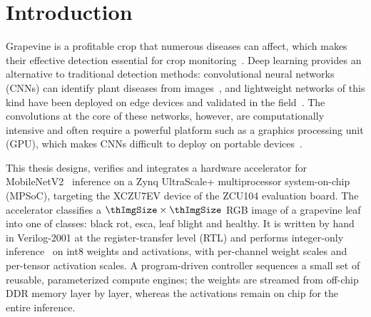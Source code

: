 %
\chapter{Introduction}
\label{chap:introduction}

Grapevine is a profitable crop that numerous diseases can affect, which makes
their effective detection essential for crop
monitoring~\cite{morellos2024iot}. Deep learning provides an alternative to
traditional detection methods: convolutional neural networks (CNNs) can
identify plant diseases from
images~\cite{mohanty2016plantdisease,liu2020grape}, and lightweight networks
of this kind have been deployed on edge devices and validated in the
field~\cite{morellos2024iot}. The convolutions at the core of these networks,
however, are computationally intensive and often require a powerful platform
such as a graphics processing unit (GPU), which makes CNNs difficult to deploy
on portable devices~\cite{bai2018dwsep}.

This thesis designs, verifies and integrates a hardware accelerator for
MobileNetV2~\cite{sandler2018mobilenetv2} inference on a Zynq UltraScale+
multiprocessor system-on-chip (MPSoC), targeting the XCZU7EV device of the
ZCU104 evaluation board. The accelerator classifies a
$\thImgSize \times \thImgSize$ RGB image of a grapevine leaf into one of
\thClasses{} classes: black rot, esca, leaf blight and healthy. It is written
by hand in Verilog-2001 at the register-transfer level (RTL) and performs
integer-only inference~\cite{jacob2018quantization} on int8 weights and
activations, with per-channel weight scales and per-tensor activation scales.
A program-driven controller sequences a small set of reusable, parameterized
compute engines; the weights are streamed from off-chip DDR memory layer by
layer, whereas the activations remain on chip for the entire inference.


